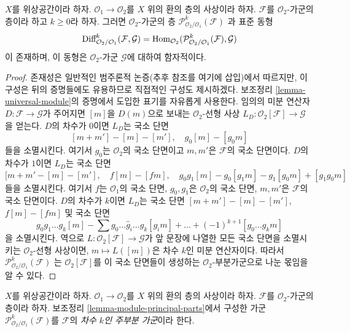 \begin{lemma}
\label{lemma-module-principal-parts}
$X$를 위상공간이라 하자.
$\mathcal{O}_1 \to \mathcal{O}_2$를 $X$ 위의 환의 층의 사상이라 하자.
$\mathcal{F}$를 $\mathcal{O}_2$-가군의 층이라 하고 $k \geq 0$라 하자.
그러면 $\mathcal{O}_2$-가군의 층
$\mathcal{P}^k_{\mathcal{O}_2/\mathcal{O}_1}(\mathcal{F})$
과 표준 동형
$$
\text{Diff}^k_{\mathcal{O}_2/\mathcal{O}_1}(\mathcal{F}, \mathcal{G}) =
\mathop{\mathrm{Hom}}\nolimits_{\mathcal{O}_2}(
\mathcal{P}^k_{\mathcal{O}_2/\mathcal{O}_1}(\mathcal{F}), \mathcal{G})
$$
이 존재하며, 이 동형은 $\mathcal{O}_2$-가군 $\mathcal{G}$에 대하여
함자적이다.
\end{lemma}

\begin{proof}
존재성은 일반적인 범주론적 논증(추후 참조를 여기에 삽입)에서 따르지만,
이 구성은 뒤의 증명들에도 유용하므로 직접적인 구성도 제시하겠다.
보조정리 \ref{lemma-universal-module}의 증명에서 도입한 표기를
자유롭게 사용한다. 임의의 미분 연산자
$D : \mathcal{F} \to \mathcal{G}$가 주어지면 $[m]$을 $D(m)$으로 보내는
$\mathcal{O}_2$-선형 사상
$L_D : \mathcal{O}_2[\mathcal{F}] \to \mathcal{G}$
을 얻는다. $D$의 차수가 $0$이면 $L_D$는 국소 단면
$$
[m + m'] - [m] - [m'],\quad
g_0[m] - [g_0m]
$$
들을 소멸시킨다. 여기서 $g_0$는 $\mathcal{O}_2$의 국소 단면이고
$m, m'$은 $\mathcal{F}$의 국소 단면이다. $D$의 차수가 $1$이면
$L_D$는 국소 단면
$$
[m + m' - [m] - [m'],\quad
f[m] - [fm], \quad
g_0g_1[m] - g_0[g_1m] - g_1[g_0m] + [g_1g_0m]
$$
들을 소멸시킨다. 여기서 $f$는 $\mathcal{O}_1$의 국소 단면,
$g_0, g_1$은 $\mathcal{O}_2$의 국소 단면, $m, m'$은
$\mathcal{F}$의 국소 단면이다. $D$의 차수가 $k$이면 $L_D$는
국소 단면 $[m + m'] - [m] - [m']$, $f[m] - [fm]$ 및 국소 단면
$$
g_0g_1\ldots g_k[m] - \sum g_0 \ldots \hat g_i \ldots g_k[g_im] + \ldots
+(-1)^{k + 1}[g_0\ldots g_km]
$$
을 소멸시킨다. 역으로 $L : \mathcal{O}_2[\mathcal{F}] \to \mathcal{G}$가
앞 문장에 나열한 모든 국소 단면을 소멸시키는 $\mathcal{O}_2$-선형
사상이면, $m \mapsto L([m])$은 차수 $k$인 미분 연산자이다.
따라서
$\mathcal{P}^k_{\mathcal{O}_2/\mathcal{O}_1}(\mathcal{F})$
는 $\mathcal{O}_2[\mathcal{F}]$를 이 국소 단면들이 생성하는
$\mathcal{O}_2$-부분가군으로 나눈 몫임을 알 수 있다.
\end{proof}

\begin{definition}
\label{definition-module-principal-parts}
$X$를 위상공간이라 하자.
$\mathcal{O}_1 \to \mathcal{O}_2$를 $X$ 위의 환의 층의 사상이라 하자.
$\mathcal{F}$를 $\mathcal{O}_2$-가군의 층이라 하자.
보조정리 \ref{lemma-module-principal-parts}에서 구성한 가군
$\mathcal{P}^k_{\mathcal{O}_2/\mathcal{O}_1}(\mathcal{F})$를
$\mathcal{F}$의 {\it 차수 $k$인 주부분 가군}이라 한다.
\end{definition}

